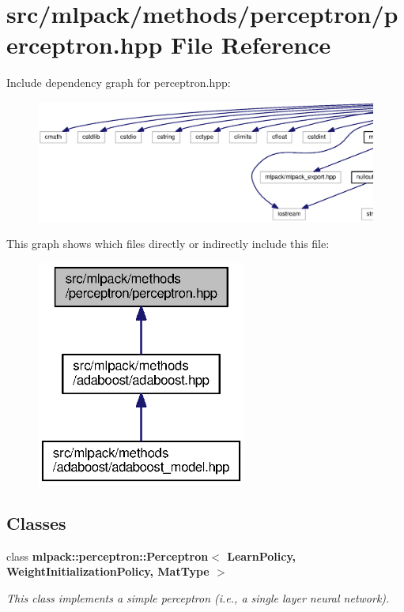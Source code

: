\section{src/mlpack/methods/perceptron/perceptron.hpp File Reference}
\label{perceptron_8hpp}
Include dependency graph for perceptron.\+hpp\+:
\nopagebreak
\begin{figure}[H]
\begin{center}
\leavevmode
\includegraphics[width=350pt]{perceptron_8hpp__incl}
\end{center}
\end{figure}
This graph shows which files directly or indirectly include this file\+:
\nopagebreak
\begin{figure}[H]
\begin{center}
\leavevmode
\includegraphics[width=196pt]{perceptron_8hpp__dep__incl}
\end{center}
\end{figure}
\subsection*{Classes}
\begin{DoxyCompactItemize}
\item 
class {\bf mlpack\+::perceptron\+::\+Perceptron$<$ Learn\+Policy, Weight\+Initialization\+Policy, Mat\+Type $>$}
\begin{DoxyCompactList}\small\item\em This class implements a simple perceptron (i.\+e., a single layer neural network). \end{DoxyCompactList}\end{DoxyCompactItemize}
